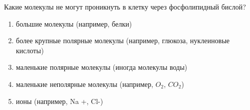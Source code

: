 
Какие молекулы не
могут проникнуть в клетку через фосфолипидный бислой?

\begin{enumerate}
    \item большие молекулы (например, белки)
    \item более крупные полярные молекулы (например, глюкоза, нуклеиновые кислоты)
    \item маленькие полярные молекулы (иногда молекулы воды)
    \item маленькие неполярные молекулы (например, $O_2$, $CO_2$)
    \item ионы (например, Na +, Cl-)
\end{enumerate}


\explanationSection

